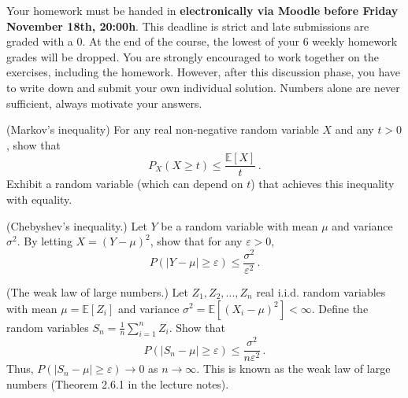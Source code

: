 \documentclass[a4paper,10pt,landscape,twocolumn]{scrartcl}
\newcommand\deadline{Friday November 18th, 20:00h}
\begin{document}
\homeworkproblems

{\sffamily\noindent
Your homework must be handed in \textbf{electronically via Moodle before \deadline}. This deadline is strict and late submissions are graded with a 0. At the end of the course, the lowest of your 6 weekly homework grades will be dropped. You are strongly encouraged to work together on the exercises, including the homework. However, after this discussion phase, you have to write down and submit your own individual solution. Numbers alone are never sufficient, always motivate your answers.
}

\begin{exercise}
	\begin{subex}[(3pt)] (Markov's inequality) For any real non-negative random variable $X$ and any $t > 0$, show that
	\[
	P_X(X \geq t) \leq \frac{\mathbb{E}[X]}{t}\, .
	\]
	Exhibit a random variable (which can depend on $t$) that achieves this inequality with equality.
	\end{subex}
	\begin{subex}[(2pt)] (Chebyshev's inequality.) Let $Y$ be a random variable with mean $\mu$ and variance $\sigma^2$. By letting $X = (Y - \mu)^2$, show that for any $\varepsilon > 0$,
	\[
	P(|Y - \mu| \geq \varepsilon) \leq \frac{\sigma^2}{\varepsilon^2} \, .
	\]
	\end{subex}
	\begin{subex}[(2pt)] (The weak law of large numbers.) Let $Z_1, Z_2, ..., Z_n$ real i.i.d. random variables with mean $\mu = \mathbb{E}[Z_i]$ and variance $\sigma^2 = \mathbb{E}[(X_i - \mu)^2] < \infty$. Define the random variables $S_n = \frac{1}{n} \sum_{i=1}^n Z_i$. Show that
	\[
	P(|S_n - \mu | \geq \varepsilon) \leq \frac{\sigma^2}{n\varepsilon^2}\, .
	\]
	Thus, $P(|S_n - \mu| \geq \varepsilon) \to 0$ as $n \to \infty$. This is known as the weak law of large numbers (Theorem 2.6.1 in the lecture notes).
	\end{subex}
\end{exercise}
\end{document}
